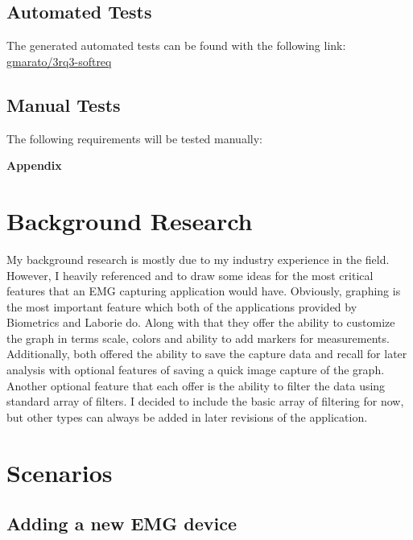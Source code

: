 \documentclass[12pt,a4paper]{article}
\begin{document}
\subsection{Automated Tests}

The generated automated tests can be found with the following link: \href{https://github.com/gmarato/3rq3-softreq}{gmarato/3rq3-softreq}

\subsection{Manual Tests}

The following requirements will be tested manually:

\newpage

\begin{flushleft}
\textbf{{\Large Appendix}}
\end{flushleft}
\appendix
\section{Background Research}

My background research is mostly due to my industry experience in the field. However, I heavily referenced \cite{Biometrics} and \cite{Laborie}
to draw some ideas for the most critical features that an EMG capturing application would have. Obviously, graphing is the most important feature
which both of the applications provided by Biometrics and Laborie do. Along with that they offer the ability to customize the graph in terms scale,
colors and ability to add markers for measurements. Additionally, both offered the ability to save the capture data and recall for later analysis 
with optional features of saving a quick image capture of the graph. Another optional feature that each offer is the ability to filter the data using
standard array of filters. I decided to include the basic array of filtering for now, but other types can always be added in later revisions of the application. 

\newpage

\section{Scenarios}

\subsection{Adding a new EMG device}
\end{document}
